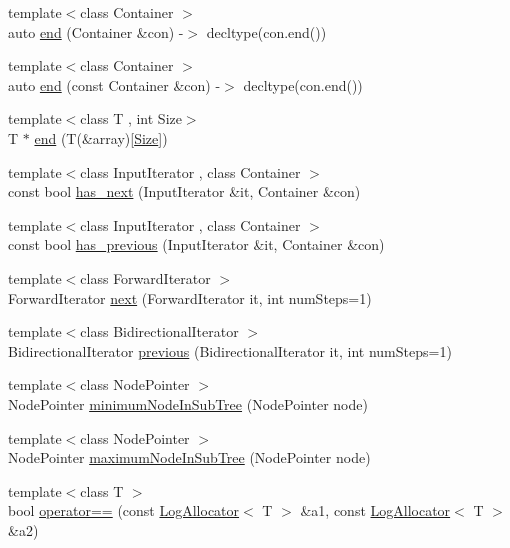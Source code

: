 \begin{DoxyCompactItemize}
\item 
{\footnotesize template$<$class Container $>$ }\\auto \hyperlink{namespaceprism_acd1f6ce5ed6fe400694b77f49270ea36}{end} (Container \&con) -\/$>$ decltype(con.\+end())
\item 
{\footnotesize template$<$class Container $>$ }\\auto \hyperlink{namespaceprism_a81b99f9ade4f7bd30ab1c5a64a20d539}{end} (const Container \&con) -\/$>$ decltype(con.\+end())
\item 
{\footnotesize template$<$class T , int Size$>$ }\\T $\ast$ \hyperlink{namespaceprism_a9b7ee229aa856b527057b2abdf6cf144}{end} (T(\&array)\mbox{[}\hyperlink{classprism_1_1_size}{Size}\mbox{]})
\item 
{\footnotesize template$<$class Input\+Iterator , class Container $>$ }\\const bool \hyperlink{namespaceprism_ad56900cb33be6d15ac27a7c61bad2ce6}{has\+\_\+next} (Input\+Iterator \&it, Container \&con)
\item 
{\footnotesize template$<$class Input\+Iterator , class Container $>$ }\\const bool \hyperlink{namespaceprism_af20b814018d65b46e6d08eb450c176c9}{has\+\_\+previous} (Input\+Iterator \&it, Container \&con)
\item 
{\footnotesize template$<$class Forward\+Iterator $>$ }\\Forward\+Iterator \hyperlink{namespaceprism_a16771cef03b7354150e188f4ce10f6b1}{next} (Forward\+Iterator it, int num\+Steps=1)
\item 
{\footnotesize template$<$class Bidirectional\+Iterator $>$ }\\Bidirectional\+Iterator \hyperlink{namespaceprism_a8370841f58d9898247afa42c49a7658d}{previous} (Bidirectional\+Iterator it, int num\+Steps=1)
\item 
{\footnotesize template$<$class Node\+Pointer $>$ }\\Node\+Pointer \hyperlink{namespaceprism_a8aab2862319b55b02ddcb6b9659b3699}{minimum\+Node\+In\+Sub\+Tree} (Node\+Pointer node)
\item 
{\footnotesize template$<$class Node\+Pointer $>$ }\\Node\+Pointer \hyperlink{namespaceprism_a6db5694fde99b39da76f51463f300c4a}{maximum\+Node\+In\+Sub\+Tree} (Node\+Pointer node)
\item 
{\footnotesize template$<$class T $>$ }\\bool \hyperlink{namespaceprism_a7f163cf0ef281768da60b400045aa8d8}{operator==} (const \hyperlink{classprism_1_1_log_allocator}{Log\+Allocator}$<$ T $>$ \&a1, const \hyperlink{classprism_1_1_log_allocator}{Log\+Allocator}$<$ T $>$ \&a2)

\end{DoxyCompactItemize}
